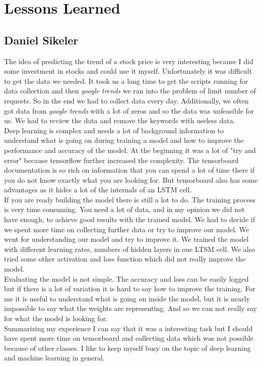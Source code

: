 \section{Lessons Learned}
\label{sec:lessonslearned}

\subsection{Daniel Sikeler}
\label{sec:llDS}
The idea of predicting the trend of a stock price is very interesting because I did some investment in stocks and could use it myself. Unfortunately it was difficult to get the data we needed. It took us a long time to get the scripts running for data collection and then \textit{google trends} we ran into the problem of limit number of requests. So in the end we had to collect data every day. Additionally, we often got data from \textit{google trends} with a lot of zeros and so the data was unfeasible for us. We had to review the data and remove the keywords with useless data.\\
Deep learning is complex and needs a lot of background information to understand what is going on during training a model and how to improve the performance and accuracy of the model. At the beginning it was a lot of "try and error" because tensorflow further increased the complexity. The tensorboard documentation is so rich on information that you can spend a lot of time there if you do not know exactly what you are looking for. But tensorboard also has some advantages as it hides a lot of the internals of an LSTM cell.\\
If you are ready building the model there is still a lot to do. The training process is very time consuming. You need a lot of data, and in my opinion we did not have enough, to achieve good results with the trained model. We had to decide if we spent more time on collecting further data or try to improve our model. We went for understanding our model and try to improve it. We trained the model with different learning rates, numbers of hidden layers in one LTSM cell. We also tried some other activation and loss function which did not really improve the model.\\
Evaluating the model is not simple. The accuracy and loss can be easily logged but if there is a lot of variation it is hard to say how to improve the training. For me it is useful to understand what is going on inside the model, but it is nearly impossible to say what the weights are representing. And so we can not really say for what the model is looking for.\\
Summarizing my experience I can say that it was a interesting task but I should have spent more time on tensorboard and collecting data which was not possible because of other classes. I like to keep myself busy on the topic of deep learning and machine learning in general. 

